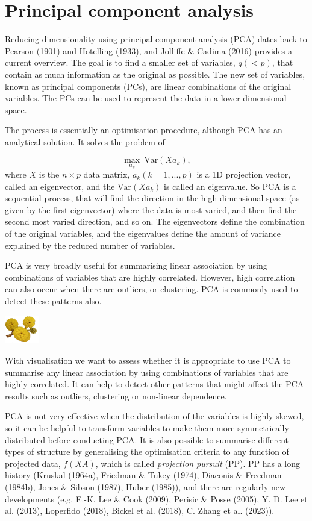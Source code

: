 \documentclass[
  letterpaper,
]{krantz}
\newcommand{\infobox}[1]{%
\noindent\colorbox{info!30}{%
\begin{minipage}{0.98\linewidth}%
    \centering%
    \begin{minipage}[c]{0.15\linewidth} %
      \includegraphics[width=1.5cm]{images/mulga-flowers2.png} %
    \end{minipage}%
    \hfill %
    \begin{minipage}[c]{0.8\linewidth} %
      \bigskip%
      \textsf{#1}%
      \bigskip%
    \end{minipage}%
    \hspace*{3mm}%
  \end{minipage}%
}%
}
\begin{document}

\chapter{Principal component
analysis}\label{principal-component-analysis}


Reducing dimensionality using principal component analysis (PCA) dates
back to Pearson (1901) and Hotelling (1933), and Jolliffe \& Cadima
(2016) provides a current overview. The goal is to find a smaller set of
variables, \(q (< p)\), that contain as much information as the original
as possible. The new set of variables, known as principal components
(PCs), are linear combinations of the original variables. The PCs can be
used to represent the data in a lower-dimensional space.

The process is essentially an optimisation procedure, although PCA has
an analytical solution. It solves the problem of

\[
\max_{a_k} ~\text{Var} (Xa_k),
\] where \(X\) is the \(n \times p\) data matrix, \(a_k (k=1, ..., p)\)
is a 1D projection vector, called an eigenvector, and the
\(\text{Var} (Xa_k)\) is called an eigenvalue. So PCA is a sequential
process, that will find the direction in the high-dimensional space (as
given by the first eigenvector) where the data is most varied, and then
find the second most varied direction, and so on. The eigenvectors
define the combination of the original variables, and the eigenvalues
define the amount of variance explained by the reduced number of
variables. 

PCA is very broadly useful for summarising linear association by using
combinations of variables that are highly correlated. However, high
correlation can also occur when there are outliers, or clustering. PCA
is commonly used to detect these patterns also.

\infobox{With visualisation we want to assess whether it is appropriate to use PCA to summarise any linear association by using combinations of variables that are highly correlated. It can help to detect other patterns that might affect the PCA results such as outliers, clustering or non-linear dependence.}

PCA is not very effective when the distribution of the variables is
highly skewed, so it can be helpful to transform variables to make them
more symmetrically distributed before conducting PCA. It is also
possible to summarise different types of structure by generalising the
optimisation criteria to any function of projected data, \(f(XA)\),
which is called \emph{projection pursuit} (PP). PP has a long history
(Kruskal (1964a), Friedman \& Tukey (1974), Diaconis \& Freedman
(1984b), Jones \& Sibson (1987), Huber (1985)), and there are regularly
new developments (e.g. E.-K. Lee \& Cook (2009), Perisic \& Posse
(2005), Y. D. Lee et al. (2013), Loperfido (2018), Bickel et al. (2018),
C. Zhang et al. (2023)).
\end{document}

